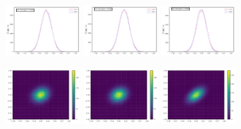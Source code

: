 \documentclass[twocolumn,preprintnumbers,superscriptaddress]{revtex4-2}
\begin{document}
\begin{figure}
  \includegraphics[width=0.25\textwidth]{plots/3Dgaussian_posdef/1-distribution_100000_100_3_5_2_10000_128_0.5.pdf}%
  \includegraphics[width=0.25\textwidth]{plots/3Dgaussian_posdef/2-distribution_100000_100_3_5_2_10000_128_0.5.pdf}%
  \includegraphics[width=0.25\textwidth]{plots/3Dgaussian_posdef/3-distribution_100000_100_3_5_2_10000_128_0.5.pdf}

  \includegraphics[width=0.25\textwidth]{plots/3Dgaussian_posdef/1-2_REAL_100000_100.pdf}%
  \includegraphics[width=0.25\textwidth]{plots/3Dgaussian_posdef/2-3_REAL_100000_100.pdf}%
  \includegraphics[width=0.25\textwidth]{plots/3Dgaussian_posdef/3-1_REAL_100000_100.pdf}


\end{figure}
\end{document}
